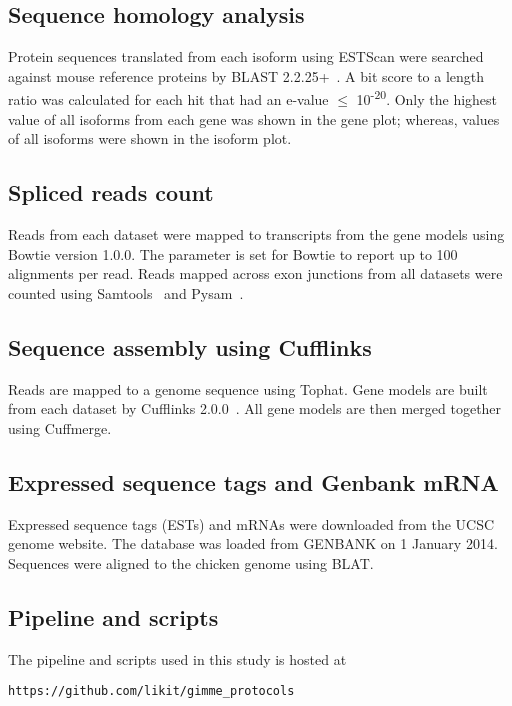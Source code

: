 \subsection{Sequence homology analysis}

Protein sequences translated from each isoform using ESTScan were searched
against mouse reference proteins by BLAST 2.2.25+~\cite{Tatusova:1999tz}.  A bit
score to a length ratio was calculated for each hit that had an e-value $\le$
10\textsuperscript{-20}.  Only the highest value of all isoforms from each gene
was shown in the gene plot; whereas, values of all isoforms were shown in the
isoform plot.

\subsection{Spliced reads count}

Reads from each dataset were mapped to transcripts from the gene models using
Bowtie version 1.0.0. The parameter is set for Bowtie to report up to 100
alignments per read.  Reads mapped across exon junctions from all datasets were
counted using Samtools~\cite{li2009sequence} and Pysam~\cite{pysam}.

\subsection{Sequence assembly using Cufflinks}
Reads are mapped to a genome sequence using Tophat.  Gene models are built from
each dataset by Cufflinks 2.0.0~\cite{Trapnell:2010kd}.  All gene models are
then merged together using Cuffmerge.

\subsection{Expressed sequence tags and Genbank mRNA}
Expressed sequence tags (ESTs) and mRNAs were downloaded from the UCSC genome
website.  The database was loaded from GENBANK on 1 January 2014.  Sequences
were aligned to the chicken genome using BLAT.

\subsection{Pipeline and scripts}

The pipeline and scripts used in this study is hosted at

\texttt{https://github.com/likit/gimme\_protocols}
